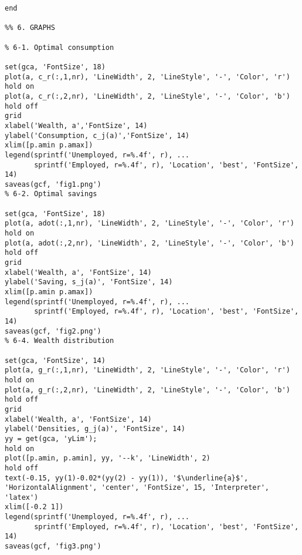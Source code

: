 \begin{lstlisting}
end

%% 6. GRAPHS 

% 6-1. Optimal consumption 

set(gca, 'FontSize', 18)
plot(a, c_r(:,1,nr), 'LineWidth', 2, 'LineStyle', '-', 'Color', 'r')
hold on
plot(a, c_r(:,2,nr), 'LineWidth', 2, 'LineStyle', '-', 'Color', 'b')
hold off
grid
xlabel('Wealth, a','FontSize', 14)
ylabel('Consumption, c_j(a)','FontSize', 14)
xlim([p.amin p.amax])
legend(sprintf('Unemployed, r=%.4f', r), ...
       sprintf('Employed, r=%.4f', r), 'Location', 'best', 'FontSize', 14)
saveas(gcf, 'fig1.png')
% 6-2. Optimal savings 

set(gca, 'FontSize', 18)
plot(a, adot(:,1,nr), 'LineWidth', 2, 'LineStyle', '-', 'Color', 'r')
hold on
plot(a, adot(:,2,nr), 'LineWidth', 2, 'LineStyle', '-', 'Color', 'b')
hold off
grid
xlabel('Wealth, a', 'FontSize', 14)
ylabel('Saving, s_j(a)', 'FontSize', 14)
xlim([p.amin p.amax])
legend(sprintf('Unemployed, r=%.4f', r), ...
       sprintf('Employed, r=%.4f', r), 'Location', 'best', 'FontSize', 14)
saveas(gcf, 'fig2.png')
% 6-4. Wealth distribution

set(gca, 'FontSize', 14)
plot(a, g_r(:,1,nr), 'LineWidth', 2, 'LineStyle', '-', 'Color', 'r')
hold on
plot(a, g_r(:,2,nr), 'LineWidth', 2, 'LineStyle', '-', 'Color', 'b')
hold off
grid
xlabel('Wealth, a', 'FontSize', 14)
ylabel('Densities, g_j(a)', 'FontSize', 14)
yy = get(gca, 'yLim');
hold on
plot([p.amin, p.amin], yy, '--k', 'LineWidth', 2)
hold off
text(-0.15, yy(1)-0.02*(yy(2) - yy(1)), '$\underline{a}$', 'HorizontalAlignment', 'center', 'FontSize', 15, 'Interpreter', 'latex')
xlim([-0.2 1])
legend(sprintf('Unemployed, r=%.4f', r), ...
       sprintf('Employed, r=%.4f', r), 'Location', 'best', 'FontSize', 14)
saveas(gcf, 'fig3.png')


\end{lstlisting}


